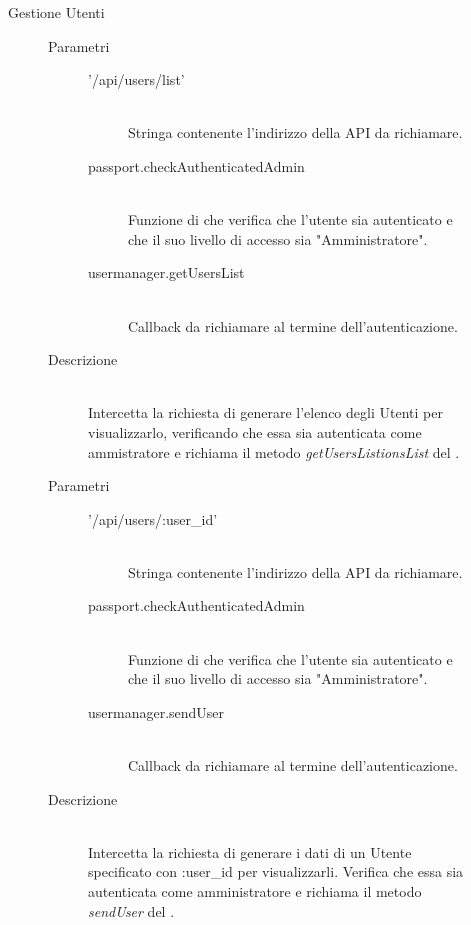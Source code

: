 \begin{description}
\begin{description}
\begin{mldescription}
 \end{mldescription}  
 
 \item[Gestione Utenti] 
  \begin{mldescription}
     \hfill 
    \begin{description}
    \item[Parametri] \hfill
     \begin{description}
      \item['/api/users/list'] \hfill \\
      Stringa contenente l'indirizzo della API da richiamare.
      \item[passport.checkAuthenticatedAdmin] \hfill \\
      Funzione di  che verifica che l'utente sia autenticato e che il suo livello di accesso sia "Amministratore".
      \item[usermanager.getUsersList] \hfill \\
      Callback da richiamare al termine dell'autenticazione.
     \end{description}
    \item[Descrizione] \hfill \\
    Intercetta la richiesta di generare l'elenco degli Utenti per visualizzarlo, verificando che essa sia autenticata come ammistratore e richiama il metodo \textit{getUsersListionsList} del .
    \end{description} 
    
     \hfill
    \begin{description}
    \item[Parametri] \hfill
     \begin{description}
      \item['/api/users/:user\_id'] \hfill \\
      Stringa contenente l'indirizzo della API da richiamare.
      \item[passport.checkAuthenticatedAdmin] \hfill \\
      Funzione di  che verifica che l'utente sia autenticato e che il suo livello di accesso sia "Amministratore".
      \item[usermanager.sendUser] \hfill \\
      Callback da richiamare al termine dell'autenticazione.
     \end{description}
    \item[Descrizione] \hfill \\
    Intercetta la richiesta di generare i dati di un Utente specificato con :user\_id per visualizzarli. Verifica che essa sia autenticata come amministratore e richiama il metodo \textit{sendUser} del .
    \end{description} 
    

\end{mldescription}
\end{description}
\end{description}
